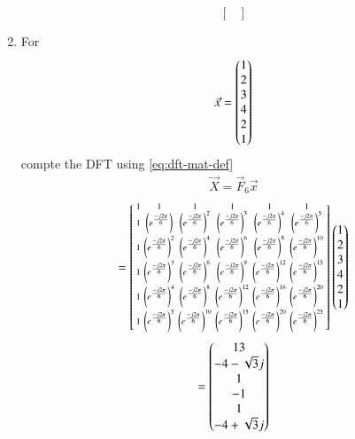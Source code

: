 \documentclass[journal,12pt,twocolumn]{IEEEtran}
\renewcommand\thesection{\arabic{section}}
\begin{document}
\begin{enumerate}[label=\arabic*.,ref=\thesection.\theenumi]
\begin{equation}
\begin{bmatrix}
		\end{bmatrix}
	\end{equation}
	\item For 
	\begin{align}
		\vec{x} = \begin{pmatrix}1\\2\\3\\4\\2\\1\end{pmatrix}
		\label{eq:equation1}
	\end{align}
	compte the DFT  
	using 
	\eqref{eq:dft-mat-def}\\
	\solution
	\begin{align}
		\vec{X} = \vec{F}_6 \vec{x}
	\end{align}	
	\begin{align}
		= \begin{bsmallmatrix}
			1	&	1	&	1	&	1	&	1	&	1\\
			1	&	\left(e^{\frac{-j2\pi}{6}}\right)	&	\left(e^{\frac{-j2\pi}{6}}\right)^2	&	\left(e^{\frac{-j2\pi}{6}}\right)^3	&	\left(e^{\frac{-j2\pi}{6}}\right)^4	&	\left(e^{\frac{-j2\pi}{6}}\right)^5\\
			1	&	\left(e^{\frac{-j2\pi}{6}}\right)^2	&	\left(e^{\frac{-j2\pi}{6}}\right)^4	&	\left(e^{\frac{-j2\pi}{6}}\right)^6	&	\left(e^{\frac{-j2\pi}{6}}\right)^8	&	\left(e^{\frac{-j2\pi}{6}}\right)^{10}\\
			1	&	\left(e^{\frac{-j2\pi}{6}}\right)^3	&	\left(e^{\frac{-j2\pi}{6}}\right)^6	&	\left(e^{\frac{-j2\pi}{6}}\right)^9	&	\left(e^{\frac{-j2\pi}{6}}\right)^{12}	&	\left(e^{\frac{-j2\pi}{6}}\right)^{15}\\
			1	&	\left(e^{\frac{-j2\pi}{6}}\right)^4	&	\left(e^{\frac{-j2\pi}{6}}\right)^8	&	\left(e^{\frac{-j2\pi}{6}}\right)^{12}	&	\left(e^{\frac{-j2\pi}{6}}\right)^{16}	&	\left(e^{\frac{-j2\pi}{6}}\right)^{20}\\
			1	&	\left(e^{\frac{-j2\pi}{6}}\right)^5	&	\left(e^{\frac{-j2\pi}{6}}\right)^{10}	&	\left(e^{\frac{-j2\pi}{6}}\right)^{15}	&	\left(e^{\frac{-j2\pi}{6}}\right)^{20}	&	\left(e^{\frac{-j2\pi}{6}}\right)^{25}
		\end{bsmallmatrix}
		\begin{pmatrix}1\\2\\3\\4\\2\\1\end{pmatrix}
	\end{align}
	\begin{align}
		=\myvec{13\\-4 - \sqrt{3}j\\ 1\\-1\\1\\-4 + \sqrt{3}j}

\end{align}
\end{enumerate}
\end{document}
